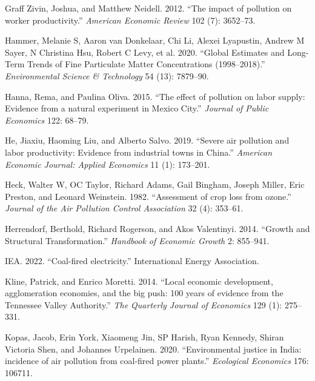 \documentclass[
]{article}
\newlength{\cslhangindent}
\newlength{\cslentryspacingunit} %
\newenvironment{CSLReferences}[2] %
 {%
  \setlength{\parindent}{0pt}
  \ifodd #1
  \let\oldpar\par
  \def\par{\hangindent=\cslhangindent\oldpar}
  \fi
  \setlength{\parskip}{#2\cslentryspacingunit}
 }%
 {}
\begin{document}
\begin{CSLReferences}{1}{0}
\leavevmode{}%
Graff Zivin, Joshua, and Matthew Neidell. 2012. {``{The impact of pollution on worker productivity}.''} \emph{{American Economic Review}} 102 (7): 3652--73.

\leavevmode{}%
Hammer, Melanie S, Aaron van Donkelaar, Chi Li, Alexei Lyapustin, Andrew M Sayer, N Christina Hsu, Robert C Levy, et al. 2020. {``Global Estimates and Long-Term Trends of Fine Particulate Matter Concentrations (1998--2018).''} \emph{{Environmental Science \& Technology}} 54 (13): 7879--90.

\leavevmode{}%
Hanna, Rema, and Paulina Oliva. 2015. {``{The effect of pollution on labor supply: Evidence from a natural experiment in Mexico City}.''} \emph{{Journal of Public Economics}} 122: 68--79.

\leavevmode{}%
He, Jiaxiu, Haoming Liu, and Alberto Salvo. 2019. {``{Severe air pollution and labor productivity: Evidence from industrial towns in China}.''} \emph{{American Economic Journal: Applied Economics}} 11 (1): 173--201.

\leavevmode{}%
Heck, Walter W, OC Taylor, Richard Adams, Gail Bingham, Joseph Miller, Eric Preston, and Leonard Weinstein. 1982. {``{Assessment of crop loss from ozone}.''} \emph{{Journal of the Air Pollution Control Association}} 32 (4): 353--61.

\leavevmode{}%
Herrendorf, Berthold, Richard Rogerson, and Akos Valentinyi. 2014. {``Growth and Structural Transformation.''} \emph{{Handbook of Economic Growth}} 2: 855--941.

\leavevmode{}%
IEA. 2022. {``{Coal-fired electricity}.''} {International Energy Association}.

\leavevmode{}%
Kline, Patrick, and Enrico Moretti. 2014. {``{Local economic development, agglomeration economies, and the big push: 100 years of evidence from the Tennessee Valley Authority}.''} \emph{The Quarterly Journal of Economics} 129 (1): 275--331.

\leavevmode{}%
Kopas, Jacob, Erin York, Xiaomeng Jin, SP Harish, Ryan Kennedy, Shiran Victoria Shen, and Johannes Urpelainen. 2020. {``{Environmental justice in India: incidence of air pollution from coal-fired power plants}.''} \emph{{Ecological Economics}} 176: 106711.


\end{CSLReferences}
\end{document}
